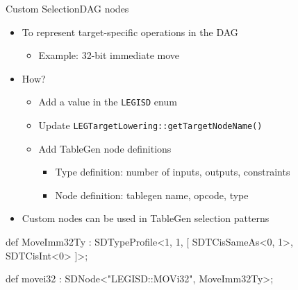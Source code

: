 

\begin{frame}[fragile]{Custom SelectionDAG nodes}

\begin{itemize}
    \item To represent target-specific operations in the DAG
    \begin{itemize}
        \item Example: 32-bit immediate move
    \end{itemize}
    \item How?
    \begin{itemize}
        \item Add a value in the \texttt{LEGISD} enum
        \item Update \texttt{LEGTargetLowering::getTargetNodeName()}
        \item Add TableGen node definitions
        \begin{itemize}
            \item Type definition: number of inputs, outputs, constraints
            \item Node definition: tablegen name, opcode, type
        \end{itemize}
    \end{itemize}
    \item Custom nodes can be used in TableGen selection patterns
\end{itemize}

\begin{codebox}
def MoveImm32Ty : SDTypeProfile<1, 1, [
  SDTCisSameAs<0, 1>, SDTCisInt<0>
]>;

def movei32 : SDNode<"LEGISD::MOVi32", MoveImm32Ty>;
\end{codebox}

\end{frame}


